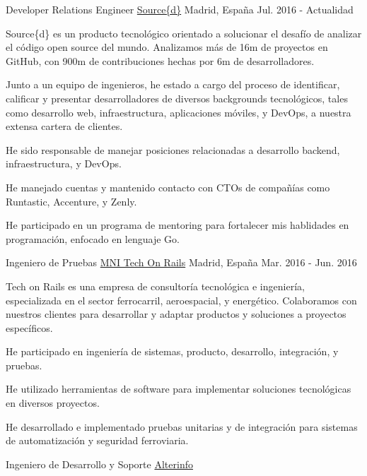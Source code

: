 \begin{cventries}
  \cventry
    {Developer Relations Engineer}
    {\href{http://www.sourced.tech/}{Source\{d\}}}
    {Madrid, España}
    {Jul. 2016 - Actualidad}
    {
      Source\{d\} es un producto tecnológico orientado a solucionar el desafío de analizar el código open source del mundo. Analizamos más de 16m de proyectos en GitHub, con 900m de contribuciones hechas por 6m de desarrolladores.\vspace{4mm}
      \begin{cvitems}
       \item {Junto a un equipo de ingenieros, he estado a cargo del proceso de identificar, calificar y presentar desarrolladores de diversos backgrounds tecnológicos, tales como desarrollo web, infraestructura, aplicaciones móviles, y DevOps, a nuestra extensa cartera de clientes.} 
       \item {He sido responsable de manejar posiciones relacionadas a desarrollo backend, infraestructura, y DevOps.}
      \item {He manejado cuentas y mantenido contacto con CTOs de compañías como Runtastic, Accenture, y Zenly.}
      \item {He participado en un programa de mentoring para fortalecer mis hablidades en programación, enfocado en lenguaje Go.}
      \end{cvitems}
    }
  \cventry
    {Ingeniero de Pruebas}
    {\href{http://www.techonrails.com/}{MNI Tech On Rails}}
    {Madrid, España}
    {Mar. 2016 - Jun. 2016}
    {
    	Tech on Rails es una empresa de consultoría tecnológica e ingeniería, especializada en el sector ferrocarril, aeroespacial, y energético. Colaboramos con nuestros clientes para desarrollar y adaptar productos y soluciones a proyectos específicos.\vspace{4mm}
      \begin{cvitems}
        \item {He participado en ingeniería de sistemas, producto, desarrollo, integración, y pruebas.}
         \item {He utilizado herramientas de software para implementar soluciones tecnológicas en diversos proyectos.}
        \item {He desarrollado e implementado pruebas unitarias y de integración para sistemas de automatización y seguridad ferroviaria.}
      \end{cvitems}
    }
  \cventry
    {Ingeniero de Desarrollo y Soporte}
    {\href{http://www.alter-info.com/}{Alterinfo}}

\end{cventries}
